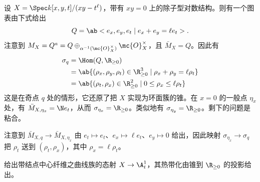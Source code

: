 \begin{exm}
    设 \(X = \Spec k[x,y,t]/(xy-t^{\ell})\)，带有 \(xy = 0\) 上的除子型对数结构。则有一个图表由下式给出
    \[ Q = \ab<e_x, e_y, e_t \mid e_x + e_y = \ell e_t>. \]
    注意到 \(M_X = Q^a = Q \oplus_{\alpha^{-1}(\mc{O}_X^{\times})} \mc{O}_X^{\times}\)，且 \(\bar{M}_X = Q\)。因此有
    \begin{align*}
        \sigma_q &= \Hom(Q, \R_{\geq 0}) \\
        &= \ab\{ (\rho_x, \rho_y, \rho_t) \in \R_{\geq 0}^3 \mid \rho_x + \rho_y = \ell \rho_t \} \\
        &= \ab\{ (\rho_t, \rho_x) \in \R_{\geq 0}^2 \mid 0 \leq \rho_x \leq \ell \rho_t \}
    \end{align*}
    这是在奇点 \(q\) 处的情形，它还原了把 \(X\) 实现为环面簇的锥。在 \(x = 0\) 的一般点 \(\eta_x\) 处，有 \(\bar{M}_{X, \eta_x} = \N e_t\)，从而 \(\sigma_{\eta_x} = \R_{\geq 0}\)。类似地有 \(\sigma_{\eta_y} = \R_{\geq 0}\)。剩下的问题是粘合。 

    注意到 \(\bar{M}_{X, q} \to \bar{M}_{X, \eta_x}\) 由 \(e_t \mapsto e_t\)、\(e_x \mapsto \ell e_t\)、\(e_y \mapsto 0\) 给出，因此映射 \(\sigma_{\eta_x} \to \sigma_q\) 把 \(\rho_t\) 送到 \((\rho_t, \rho_x)\)，其中 \(\rho_x = \ell \rho_t\)。

    给出带结点中心纤维之曲线族的态射 \(X \to \A^1_t\)，其热带化由锥到 \(\R_{\geq 0}\) 的投影给出。
\end{exm}


